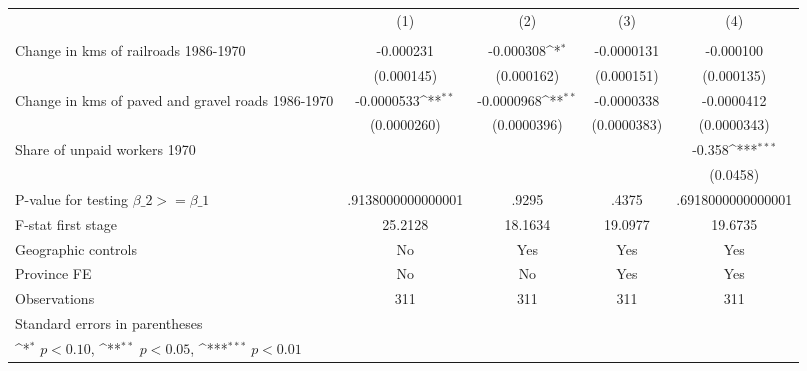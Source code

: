 {
\def\sym#1{\ifmmode^{#1}\else\(^{#1}\)\fi}
\begin{tabular}{l*{4}{c}}
\hline\hline
                &\multicolumn{1}{c}{(1)}&\multicolumn{1}{c}{(2)}&\multicolumn{1}{c}{(3)}&\multicolumn{1}{c}{(4)}\\
                &\multicolumn{1}{c}{}&\multicolumn{1}{c}{}&\multicolumn{1}{c}{}&\multicolumn{1}{c}{}\\
\hline
Change in kms of railroads 1986-1970&-0.000231         &-0.000308\sym{*}  &-0.0000131         &-0.000100         \\
                &(0.000145)         &(0.000162)         &(0.000151)         &(0.000135)         \\
[1em]
Change in kms of paved and gravel roads 1986-1970&-0.0000533\sym{**} &-0.0000968\sym{**} &-0.0000338         &-0.0000412         \\
                &(0.0000260)         &(0.0000396)         &(0.0000383)         &(0.0000343)         \\
[1em]
Share of unpaid workers 1970&                  &                  &                  &   -0.358\sym{***}\\
                &                  &                  &                  & (0.0458)         \\
\hline
P-value for testing $\beta\_{2} >= \beta\_{1}$&.9138000000000001         &    .9295         &    .4375         &.6918000000000001         \\
F-stat first stage&  25.2128         &  18.1634         &  19.0977         &  19.6735         \\
Geographic controls&       No         &      Yes         &      Yes         &      Yes         \\
Province FE     &       No         &       No         &      Yes         &      Yes         \\
Observations    &      311         &      311         &      311         &      311         \\
\hline\hline
\multicolumn{5}{l}{\footnotesize Standard errors in parentheses}\\
\multicolumn{5}{l}{\footnotesize \sym{*} \(p<0.10\), \sym{**} \(p<0.05\), \sym{***} \(p<0.01\)}\\
\end{tabular}
}
